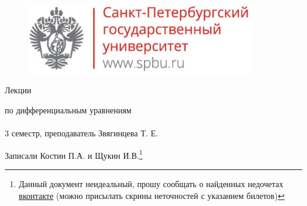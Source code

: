 \documentclass[main]{subfiles}
\begin{document}
	\begin{figure}[H]
			\includegraphics[width=10cm]{../../../template/spsu.jpg}
			\centering
	\end{figure}
	\vspace*{\fill}
	\begin{center}
		\huge Лекции

		\huge по дифференциальным уравнениям\\ \ \\
		\Large 3 семестр, преподаватель Звягинцева Т. Е.

		\large Записали Костин П.А. и Щукин И.В.\footnote{Данный документ неидеальный, прошу сообщать о найденных недочетах \href{https://vk.com/drab_existence_a}{вконтакте} (можно присылать скрины неточностей с указанием билетов)}
	\end{center}
	\vspace*{\fill}
	\vspace*{\fill}

	\newpage
	\tableofcontents
	\newpage
\end{document}

